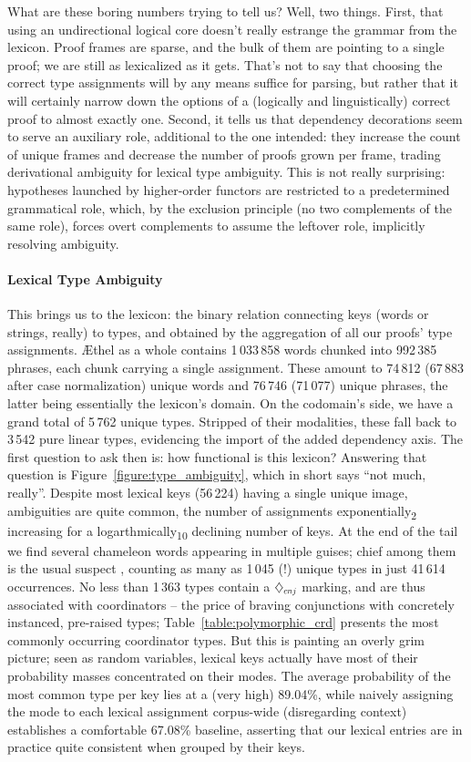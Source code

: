 What are these boring numbers trying to tell us?
Well, two things.
First, that using an undirectional logical core doesn't really estrange the grammar from the lexicon.
Proof frames are sparse, and the bulk of them are pointing to a single proof; we are still as lexicalized as it gets.
That's not to say that choosing the correct type assignments will by any means suffice for parsing, but rather that it will certainly narrow down the options of a (logically and linguistically) correct proof to almost exactly one.
Second, it tells us that dependency decorations seem to serve an auxiliary role, additional to the one intended: they increase the count of unique frames and decrease the number of proofs grown per frame, trading derivational ambiguity for lexical type ambiguity.
This is not really surprising: hypotheses launched by higher-order functors are restricted to a predetermined grammatical role, which, by the exclusion principle (no two complements of the same role), forces overt complements to assume the leftover role, implicitly resolving ambiguity.
\goodbreak


\paragraph{Lexical Type Ambiguity}
This brings us to the lexicon: the binary relation connecting keys (words or strings, really) to types, and obtained by the aggregation of all our proofs' type assignments.
\AE thel as a whole contains 1\,033\,858 words chunked into 992\,385 phrases, each chunk carrying a single assignment.
These amount to  74\,812 (67\,883 after case normalization) unique words and 76\,746 (71\,077) unique phrases, the latter being essentially the lexicon's domain.
On the codomain's side, we have a grand total of 5\,762 unique \NLPplus{} types.
Stripped of their modalities, these fall back to 3\,542 pure linear types, evidencing the import of the added dependency axis.
The first question to ask then is: how functional is this lexicon?
Answering that question is Figure~\ref{figure:type_ambiguity}, which in short says ``not much, really''.
Despite most lexical keys (56\,224) having a single unique image, ambiguities are quite common, the number of assignments exponentially\textsubscript{2} increasing for a logarthmically\textsubscript{10} declining number of keys.
At the end of the tail we find several chameleon words appearing in multiple guises; chief among them is the usual suspect , counting as many as 1\,045 (!) unique types in just 41\,614 occurrences.
No less than 1\,363 types contain a $\ddia{cnj}$ marking, and are thus associated with coordinators -- the price of braving conjunctions with concretely instanced, pre-raised types; Table~\ref{table:polymorphic_crd} presents the most commonly occurring coordinator types.
But this is painting an overly grim picture; seen as random variables, lexical keys actually have most of their probability masses concentrated on their modes.
The average probability of the most common type per key lies at a (very high) 89.04\%, while naively assigning the mode to each lexical assignment corpus-wide (disregarding context) establishes a comfortable 67.08\% baseline, asserting that our lexical entries are in practice quite consistent when grouped by their keys.


